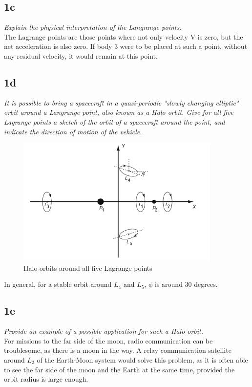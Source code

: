 \subsection{1c}
\textit{Explain the physical interpretation of the Langrange points.} \\
The Lagrange points are those points where not only velocity V is zero, but the net acceleration is also zero. If body 3 were to be placed at such a point, without any residual velocity, it would remain at this point.



\subsection{1d}
\textit{It is possible to bring a spacecraft in a quasi-periodic "slowly changing elliptic" orbit around a Langrange point, also known as a Halo orbit. Give for all five Lagrange points a sketch of the orbit of a spacecraft around the point, and indicate the direction of motion of the vehicle.} \\

\begin{figure}[H]
    \centering
    \includegraphics[width=0.7\columnwidth]{Figures/1d.png}
    \caption{Halo orbits around all five Lagrange points}
    \label{fig:haloes}
\end{figure}

In general, for a stable orbit around $L_4$ and $L_5$, $\phi$ is around 30 degrees.


\subsection{1e}
\textit{Provide an example of a possible application for such a Halo orbit.} \\
For missions to the far side of the moon, radio communication can be troublesome, as there is a moon in the way. A relay communication satellite around $L_2$ of the Earth-Moon system would solve this problem, as it is often able to see the far side of the moon and the Earth at the same time, provided the orbit radius is large enough.